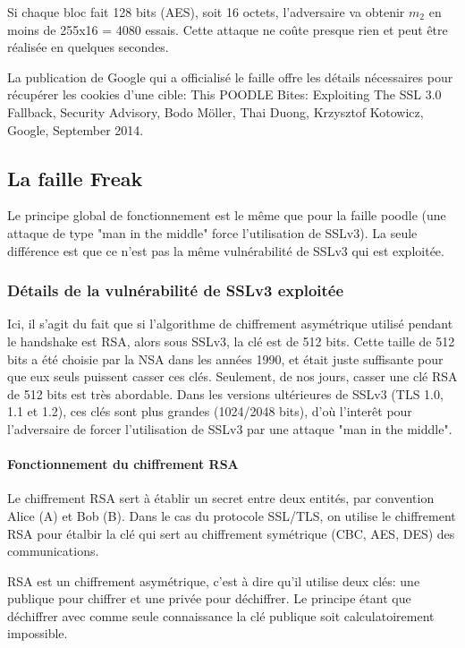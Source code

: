 Si chaque bloc fait 128 bits (AES), soit 16 octets, l'adversaire va obtenir $m_2$ en moins de 255x16 = 4080 essais. Cette attaque ne co\^ute presque rien et peut \^etre réalisée en quelques secondes.

La publication de Google qui a officialisé le faille offre les détails nécessaires pour récupérer les cookies d'une cible: This POODLE Bites: Exploiting The SSL 3.0 Fallback, Security Advisory, Bodo Möller, Thai Duong, Krzysztof Kotowicz, Google, September 2014.


\subsection{La faille Freak}

Le principe global de fonctionnement est le m\^eme que pour la faille poodle (une attaque de type "man in the middle" force l'utilisation de SSLv3). La seule différence est que ce n'est pas la m\^eme vulnérabilité de SSLv3 qui est exploitée.

\subsubsection{Détails de la vulnérabilité de SSLv3 exploitée}

Ici, il s'agit du fait que si l'algorithme de chiffrement asymétrique utilisé pendant le handshake est RSA, alors sous SSLv3, la clé est de 512 bits. Cette taille de 512 bits a été choisie par la NSA dans les années 1990, et était juste suffisante pour que eux seuls puissent casser ces clés. Seulement, de nos jours, casser une clé RSA de 512 bits est très abordable. Dans les versions ultérieures de SSLv3 (TLS 1.0, 1.1 et 1.2), ces clés sont plus grandes (1024/2048 bits), d'où l'inter\^et pour l'adversaire de forcer l'utilisation de SSLv3 par une attaque "man in the middle".

\paragraph{Fonctionnement du chiffrement RSA}

Le chiffrement RSA sert à établir un secret entre deux entités, par convention Alice (A) et Bob (B). Dans le cas du protocole SSL/TLS, on utilise le chiffrement RSA pour étalbir la clé qui sert au chiffrement symétrique (CBC, AES, DES) des communications. 

RSA est un chiffrement asymétrique, c'est à dire qu'il utilise deux clés: une publique pour chiffrer et une privée pour déchiffrer. Le principe étant que déchiffrer avec comme seule connaissance la clé publique soit calculatoirement impossible. \\


